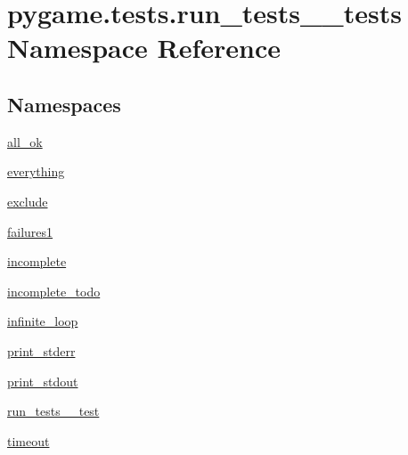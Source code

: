\hypertarget{namespacepygame_1_1tests_1_1run__tests____tests}{}\section{pygame.\+tests.\+run\+\_\+tests\+\_\+\+\_\+tests Namespace Reference}
\label{namespacepygame_1_1tests_1_1run__tests____tests}
\subsection*{Namespaces}
\begin{DoxyCompactItemize}
\item 
 \hyperlink{namespacepygame_1_1tests_1_1run__tests____tests_1_1all__ok}{all\+\_\+ok}
\item 
 \hyperlink{namespacepygame_1_1tests_1_1run__tests____tests_1_1everything}{everything}
\item 
 \hyperlink{namespacepygame_1_1tests_1_1run__tests____tests_1_1exclude}{exclude}
\item 
 \hyperlink{namespacepygame_1_1tests_1_1run__tests____tests_1_1failures1}{failures1}
\item 
 \hyperlink{namespacepygame_1_1tests_1_1run__tests____tests_1_1incomplete}{incomplete}
\item 
 \hyperlink{namespacepygame_1_1tests_1_1run__tests____tests_1_1incomplete__todo}{incomplete\+\_\+todo}
\item 
 \hyperlink{namespacepygame_1_1tests_1_1run__tests____tests_1_1infinite__loop}{infinite\+\_\+loop}
\item 
 \hyperlink{namespacepygame_1_1tests_1_1run__tests____tests_1_1print__stderr}{print\+\_\+stderr}
\item 
 \hyperlink{namespacepygame_1_1tests_1_1run__tests____tests_1_1print__stdout}{print\+\_\+stdout}
\item 
 \hyperlink{namespacepygame_1_1tests_1_1run__tests____tests_1_1run__tests____test}{run\+\_\+tests\+\_\+\+\_\+test}
\item 
 \hyperlink{namespacepygame_1_1tests_1_1run__tests____tests_1_1timeout}{timeout}
\end{DoxyCompactItemize}
